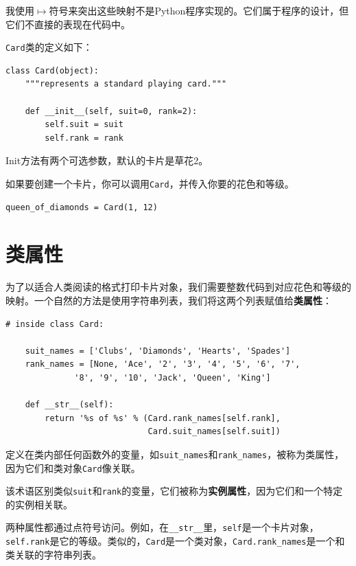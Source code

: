 我使用$\mapsto$符号来突出这些映射不是Python程序实现的。它们属于程序的设计，但它们不直接的表现在代码中。


{\tt Card}类的定义如下：

\beforeverb
\begin{verbatim}
class Card(object):
    """represents a standard playing card."""

    def __init__(self, suit=0, rank=2):
        self.suit = suit
        self.rank = rank
\end{verbatim}
\afterverb
%
Init方法有两个可选参数，默认的卡片是草花2。


如果要创建一个卡片，你可以调用{\tt Card}，并传入你要的花色和等级。

\beforeverb
\begin{verbatim}
queen_of_diamonds = Card(1, 12)
\end{verbatim}
\afterverb
%


\section{类属性}


为了以适合人类阅读的格式打印卡片对象，我们需要整数代码到对应花色和等级的映射。一个自然的方法是使用字符串列表，我们将这两个列表赋值给{\bf 类属性}：

\beforeverb
\begin{verbatim}
# inside class Card:

    suit_names = ['Clubs', 'Diamonds', 'Hearts', 'Spades']
    rank_names = [None, 'Ace', '2', '3', '4', '5', '6', '7', 
              '8', '9', '10', 'Jack', 'Queen', 'King']

    def __str__(self):
        return '%s of %s' % (Card.rank_names[self.rank],
                             Card.suit_names[self.suit])
\end{verbatim}
\afterverb
%
定义在类内部任何函数外的变量，如\verb"suit_names"和\verb"rank_names"，被称为类属性，因为它们和类对象{\tt Card}像关联。


该术语区别类似{\tt suit}和{\tt rank}的变量，它们被称为{\bf 实例属性}，因为它们和一个特定的实例相关联。


两种属性都通过点符号访问。例如，在\verb"__str__"里，{\tt self}是一个卡片对象，{\tt self.rank}是它的等级。类似的，{\tt Card}是一个类对象，\verb"Card.rank_names"是一个和类关联的字符串列表。

